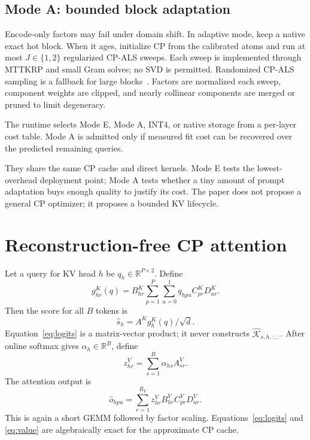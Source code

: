 \documentclass[11pt]{article}
\newcommand{\R}{\mathbb{R}}
\begin{document}
\subsection{Mode A: bounded block adaptation}

Encode-only factors may fail under domain shift. In adaptive mode, keep a native exact hot block.
When it ages, initialize CP from the calibrated atoms and run at most $J\in\{1,2\}$ regularized
CP-ALS sweeps. Each sweep is implemented through MTTKRP and small Gram solves; no SVD is permitted.
Randomized CP-ALS sampling is a fallback for large blocks~\cite{randcp}. Factors are normalized each
sweep, component weights are clipped, and nearly collinear components are merged or pruned to
limit degeneracy.

The runtime selects Mode E, Mode A, INT4, or native storage from a per-layer cost table. Mode A is
admitted only if measured fit cost can be recovered over the predicted remaining queries.

\begin{keybox}[title={Why both modes belong in one paper}]
They share the same CP cache and direct kernels. Mode E tests the lowest-overhead deployment point;
Mode A tests whether a tiny amount of prompt adaptation buys enough quality to justify its cost.
The paper does not propose a general CP optimizer; it proposes a bounded KV lifecycle.
\end{keybox}

\section{Reconstruction-free CP attention}
\label{sec:direct}

Let a query for KV head $h$ be $q_h\in\R^{P\times2}$. Define
\[
g^K_{hr}(q)=B^K_{hr}\sum_{p=1}^{P}\sum_{u=0}^{1}
q_{hpu}C^K_{pr}D^K_{ur}.
\]
Then the score for all $B$ tokens is
\begin{equation}
\widehat s_h=A^K g^K_h(q)/\sqrt d. \label{eq:logits}
\end{equation}
Equation~\eqref{eq:logits} is a matrix-vector product; it never constructs
$\widehat{\mathcal K}_{s,h,:,:}$. After online softmax gives $\alpha_h\in\R^B$, define
\[
z^V_{hr}=\sum_{s=1}^{B}\alpha_{hs}A^V_{sr}.
\]
The attention output is
\begin{equation}
\widehat o_{hpu}=\sum_{r=1}^{R_V}z^V_{hr}B^V_{hr}C^V_{pr}D^V_{ur}. \label{eq:value}
\end{equation}
This is again a short GEMM followed by factor scaling. Equations~\eqref{eq:logits} and
\eqref{eq:value} are algebraically exact for the approximate CP cache.
\end{document}
